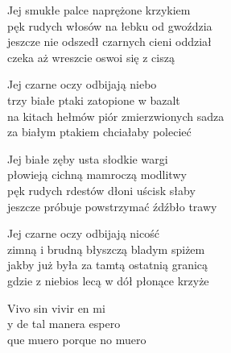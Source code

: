\begin{text}
    Jej smukłe palce naprężone krzykiem\\
    pęk rudych włosów na łebku od gwoździa\\
    jeszcze nie odszedł czarnych cieni oddział\\
    czeka aż wreszcie oswoi się z ciszą

    Jej czarne oczy odbijają niebo\\
    trzy białe ptaki zatopione w bazalt\\
    na kitach hełmów piór zmierzwionych sadza\\
    za białym ptakiem chciałaby polecieć

    Jej białe zęby usta słodkie wargi\\
    płowieją cichną mamroczą modlitwy\\
    pęk rudych rdestów dłoni uścisk słaby\\
    jeszcze próbuje powstrzymać źdźbło trawy

    Jej czarne oczy odbijają nicość\\
    zimną i brudną błyszczą bladym spiżem\\
    jakby już była za tamtą ostatnią granicą\\
    gdzie z niebios lecą w dół płonące krzyże

    Vivo sin vivir en mi\\
    y de tal manera espero\\
    que muero porque no muero
\end{text}
\begin{chord}

\end{chord}